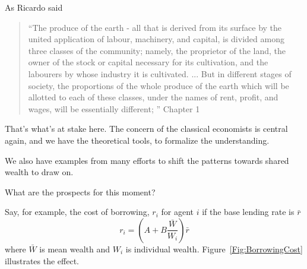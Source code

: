 As Ricardo said
\begin{quotation}   
 “The produce of the earth - all that is derived from its surface by the united application of labour, machinery, and capital, is divided among three classes of the community; namely, the proprietor of the land, the owner of the stock or capital necessary for its cultivation, and the labourers by whose industry it is cultivated. ...  But in different stages of society, the proportions of the whole produce of the earth which will be allotted to each of these classes, under the names of rent, profit, and wages, will be essentially different; ”  Chapter 1
\end{quotation}


That's what's at stake here.
The concern of the classical economists is central again, and we have the theoretical tools, to formalize the understanding.

We also have examples from many efforts to shift the patterns towards shared wealth to draw on. 

What are the prospects for this moment?



 Say, for example, the cost of borrowing, $r_i$ for agent $i$ if the base lending rate is $\bar{r}$
\[ r_i = (A + B \frac{\bar{W}}{W_i})\bar r\]
where $\bar{W}$ is mean wealth and $W_i$ is individual wealth. Figure~\ref{Fig:BorrowingCost} illustrates the effect.